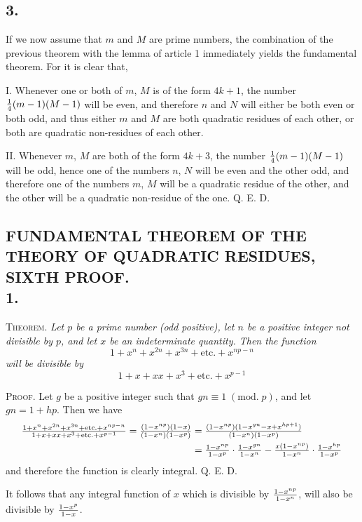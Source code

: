 \documentclass[twoside,12pt]{memoir}
\renewcommand{\pmod}[1]{\;(\textrm{mod.}\;#1)}
\let\oldfrac\frac
\def\frac#1#2{\mathchoice{\tfrac{#1}{#2}}{\oldfrac{#1}{#2}}{\genfrac{}{}{}{2}{#1}{#2\mathstrut}}{\genfrac{}{}{}{3}{#1}{#2\mathstrut}}}
\begin{document}
\subsection*{3.}
 
If we now assume that \(m\) and \(M\) are prime numbers, the combination of the previous theorem with the lemma of article 1 immediately yields the fundamental theorem. For it is clear that,
 
I. Whenever one or both of \(m\), \(M\) is of the form \(4k+1\), the number \(\frac{1}{4}(m-1)(M-1)\) will be even, and therefore \(n\) and \(N\) will either be both even or both odd, and thus either \(m\) and \(M\) are both quadratic residues of each other, or both are quadratic non-residues of each other. 
 
II. Whenever \(m\), \(M\) are both of the form \(4k+3\), the number \(\frac{1}{4}(m-1)(M-1)\) will be odd, hence one of the numbers \(n\), \(N\) will be even and the other odd, and therefore one of the numbers \(m\), \(M\) will be a quadratic residue of the other, and the other will be a quadratic non-residue of the one. Q. E. D.\pagebreak%

\subsection*{{\scriptsize FUNDAMENTAL THEOREM OF THE THEORY OF QUADRATIC RESIDUES, SIXTH PROOF.}\\
1.}
 
\textsc{Theorem.} \textit{Let \(p\) be a prime number (odd positive), let \(n\) be a positive integer not divisible by \(p\), and let \(x\) be an indeterminate quantity.  Then the function}
\[1+x^{n}+x^{2 n}+x^{3 n}+\text{etc{.}}+x^{n p-n}\]
\textit{will be divisible by}
\[1+x+x x+x^{3}+\text{etc{.}}+x^{p-1}\]
 
\textsc{Proof.} Let \(g\) be a positive integer such that \(g n \equiv 1\pmod{p}\), and let \(g n=1+h p\). Then we have
\[\begin{aligned}
\frac{1+x^{n}+x^{2 n}+x^{3 n}+\text{etc{.}}+x^{n p-n}}{1+x+x x+x^{3}+\text{etc{.}}+x^{p-1}}=\frac{(1-x^{n p})(1-x)}{(1-x^{n})(1-x^{p})} & =\frac{(1-x^{n p})(1-x^{g n}-x+x^{h p+1})}{(1-x^{n})(1-x^{p})} \\
& =\frac{1-x^{n p}}{1-x^{p}} \cdot \frac{1-x^{g n}}{1-x^{n}}-\frac{x(1-x^{n p})}{1-x^{n}} \cdot \frac{1-x^{h p}}{1-x^{p}}
\end{aligned}\]
and therefore the function is clearly integral. Q. E. D.
 
It follows that any integral function of \(x\) which is divisible by \(\frac{1-x^{n p}}{1-x^{n}}\), will also be divisible by \(\frac{1-x^{p}}{1-x}\).
\end{document}

